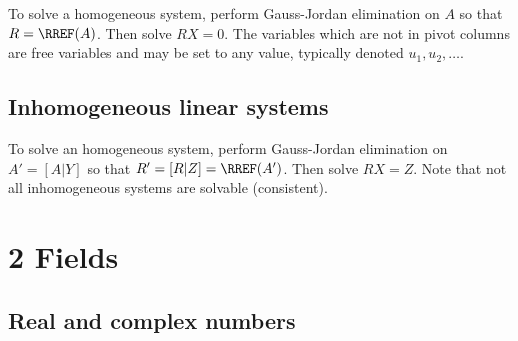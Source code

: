 \begin{procedure}[Solution] To solve a homogeneous system, perform Gauss-Jordan elimination on $A$ so that $R = \RREF(A)$. Then solve $RX = 0$. The variables which are not in pivot columns are free variables and may be set to any value, typically denoted $u_1, u_2, \ldots$.
\end{procedure}

\subsection{Inhomogeneous linear systems}

\begin{procedure}[Solution] To solve an homogeneous system, perform Gauss-Jordan elimination on $A' = [A|Y]$ so that $R' = [R|Z] = \RREF(A')$. Then solve $RX = Z$. Note that not all inhomogeneous systems are solvable (consistent).
\end{procedure}


\columnbreak

\section*{2 Fields}

\subsection{Real and complex numbers}

